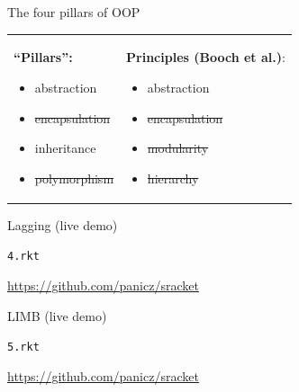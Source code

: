 \documentclass{beamer}
\begin{document}
\begin{frame}{The four pillars of OOP}
  \begin{tabularx}{\textwidth}{ X X }
    \textbf{``Pillars'':} \newline
    \begin{itemize}
    \item abstraction
    \item \sout{encapsulation}
    \item inheritance
    \item \sout{polymorphism}
    \end{itemize}
    &
    \textbf{Principles (Booch et al.)}: \newline
    \begin{itemize}
    \item abstraction
    \item \sout{encapsulation}
    \item \sout{modularity}
    \item \sout{hierarchy}
    \end{itemize}
  \end{tabularx}
\end{frame}






\begin{frame}{Lagging (live demo)}
  \begin{center}
    \Huge
    \texttt{4.rkt}
  \end{center}
  \url{https://github.com/panicz/sracket}
\end{frame}





\begin{frame}{LIMB (live demo)}
  \begin{center}
    \Huge
    \texttt{5.rkt}
  \end{center}
  \url{https://github.com/panicz/sracket}
\end{frame}
\end{document}
